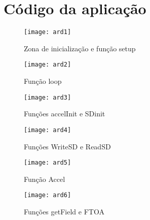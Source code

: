 \chapter{Código da aplicação}
\label{cha:codigo_da_aplicacao}

\begin{figure}[hbtp]
	\centering
	\texttt{[image: ard1]}
	\caption{Zona de inicialização e função setup}
	\label{fig:ard1}
\end{figure}

\begin{figure}[hbtp]
	\centering
	\texttt{[image: ard2]}
	\caption{Função loop}
	\label{fig:ard2}
\end{figure}

\begin{figure}[hbtp]
	\centering
	\texttt{[image: ard3]}
	\caption{Funções accelInit e SD\textunderscore init}
	\label{fig:ard3}
\end{figure}

\begin{figure}[hbtp]
	\centering
	\texttt{[image: ard4]}
	\caption{Funções WriteSD e ReadSD}
	\label{fig:ard4}
\end{figure}

\begin{figure}[hbtp]
	\centering
	\texttt{[image: ard5]}
	\caption{Função Accel}
	\label{fig:ard5}
\end{figure}

\begin{figure}[hbtp]
	\centering
	\texttt{[image: ard6]}
	\caption{Funções getField e FTOA}
	\label{fig:ard6}
\end{figure}